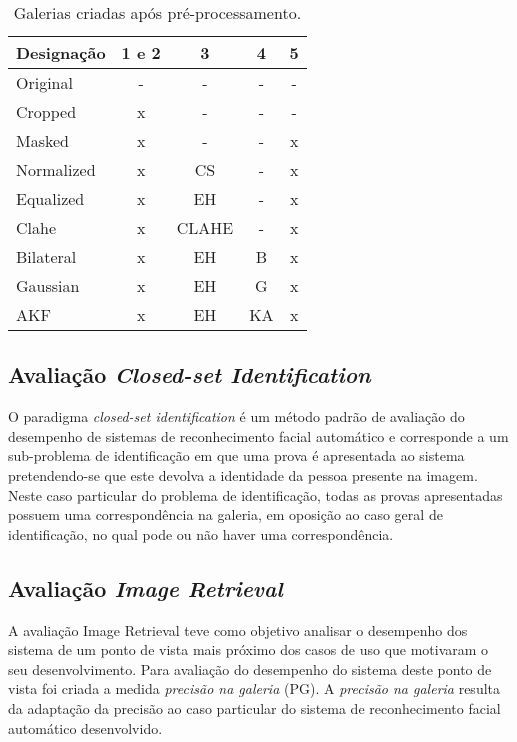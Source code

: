 \documentclass[9pt,a4paper]{extarticle}
\begin{document}
\begin{multicols}{2}
\begin{table}[H]
  \centering
	\caption{Galerias criadas após pré-processamento.}
    \begin{tabular}{l|cccc}
    \hline\hline
    Designação & 1 e 2  &  3           	 & 4 				& 5 \\
	\hline
    Original   &   -       & -               & -                &   -      \\
    Cropped    & x         & -               & -                &   -      \\
    Masked     & x         & -               & -                & x      \\
    Normalized & x         & CS & -        & x      \\
    Equalized  & x         & EH & -        & x      \\
    Clahe      & x         & CLAHE  & -        & x      \\
    Bilateral  & x         & EH & B 		 & x      \\
    Gaussian   & x         & EH & G 		 & x      \\
    AKF        & x         & EH & KA	 & x \\
    \hline\hline
    \end{tabular}
	\label{tab:colecoes}
\end{table}

\subsection{Avaliação \textit{Closed-set Identification}} \label{sec:avaliacao1}
O paradigma \textit{closed-set identification} é um método padrão de avaliação do desempenho de sistemas de reconhecimento facial automático e corresponde a um sub-problema de identificação em que uma prova é apresentada ao sistema pretendendo-se que este devolva a identidade da pessoa presente na imagem. Neste caso particular do problema de identificação, todas as provas apresentadas possuem uma correspondência na galeria, em oposição ao caso geral de identificação, no qual pode ou não haver uma correspondência.


\subsection{Avaliação \textit{Image Retrieval}} \label{sec:avaliacao2}
A avaliação Image Retrieval teve como objetivo analisar o desempenho dos sistema de um ponto de vista mais próximo dos casos de uso que motivaram o seu desenvolvimento. Para avaliação do desempenho do sistema deste ponto de vista foi criada a medida \textit{precisão na galeria} (PG). A \textit{precisão na galeria} resulta da adaptação da precisão ao caso particular do sistema de reconhecimento facial automático desenvolvido.




\end{multicols}
\end{document}
